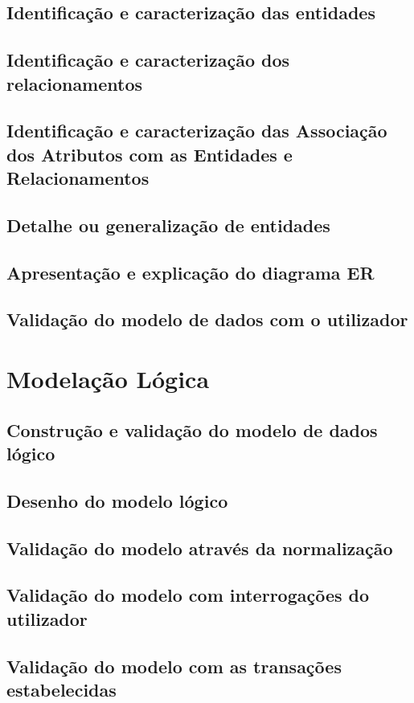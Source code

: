 \documentclass[a4paper]{article}
\begin{document}
\subsection{Identificação e caracterização das entidades}
\subsection{Identificação e caracterização dos relacionamentos}
\subsection{Identificação e caracterização das Associação dos Atributos com as Entidades e Relacionamentos}
\subsection{Detalhe ou generalização de entidades}
\subsection{Apresentação e explicação do diagrama ER}
\subsection{Validação do modelo de dados com o utilizador}

\section{Modelação Lógica}
\label{sec:4}

\subsection{Construção e validação do modelo de dados lógico}
\subsection{Desenho do modelo lógico}
\subsection{Validação do modelo através da normalização}
\subsection{Validação do modelo com interrogações do utilizador}
\subsection{Validação do modelo com as transações estabelecidas}
\end{document}
